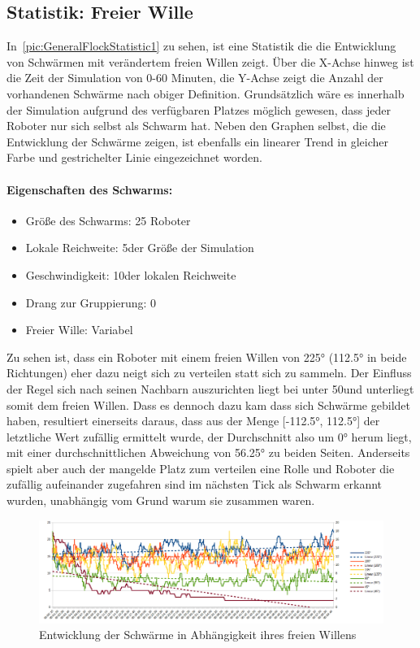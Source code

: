 \subsection*{Statistik: Freier Wille}\label{subsubsec:StatistikFreierWille}

In~\autoref{pic:GeneralFlockStatistic1} zu sehen, ist eine Statistik die die Entwicklung von Schwärmen mit verändertem freien Willen zeigt. Über die X-Achse hinweg ist die Zeit der Simulation von 0-60 Minuten, die Y-Achse zeigt die Anzahl der vorhandenen Schwärme nach obiger Definition. Grundsätzlich wäre es innerhalb der Simulation aufgrund des verfügbaren Platzes möglich gewesen, dass jeder Roboter nur sich selbst als Schwarm hat.
Neben den Graphen selbst, die die Entwicklung der Schwärme zeigen, ist ebenfalls ein linearer Trend in gleicher Farbe und gestrichelter Linie eingezeichnet worden.

\paragraph*{Eigenschaften des Schwarms:}
\begin{itemize}
	\item Größe des Schwarms: 25 Roboter
	\item Lokale Reichweite: 5\per der Größe der Simulation
	\item Geschwindigkeit: 10\per der lokalen Reichweite
	\item Drang zur Gruppierung: 0\per
	\item Freier Wille: Variabel
\end{itemize}

Zu sehen ist, dass ein Roboter mit einem freien Willen von 225° (112.5° in beide Richtungen) eher dazu neigt sich zu verteilen statt sich zu sammeln. Der Einfluss der Regel sich nach seinen Nachbarn auszurichten liegt bei unter 50\per und unterliegt somit dem freien Willen. Dass es dennoch dazu kam dass sich Schwärme gebildet haben, resultiert einerseits daraus, dass aus der Menge [-112.5°, 112.5°] der letztliche Wert zufällig ermittelt wurde, der Durchschnitt also um 0° herum liegt, mit einer durchschnittlichen Abweichung von 56.25° zu beiden Seiten. Anderseits spielt aber auch der mangelde Platz zum verteilen eine Rolle und Roboter die zufällig aufeinander zugefahren sind im nächsten Tick als Schwarm erkannt wurden, unabhängig vom Grund warum sie zusammen waren.

\begin{figure}
	\includegraphics[width=\textwidth,height=\statisticHeight]{graphics/Statistics/FlockGeneral/LocalRange1Speed01ToFlock0.png}
	\caption{Entwicklung der Schwärme in Abhängigkeit ihres freien Willens}
	\label{pic:GeneralFlockStatistic1}
\end{figure}

